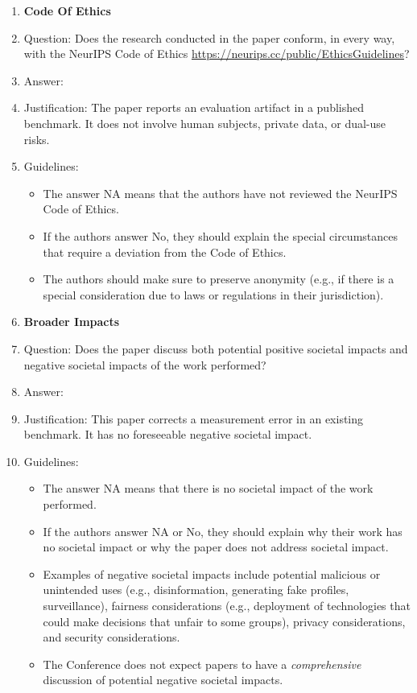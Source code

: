 \begin{enumerate}
\item {\bf Code Of Ethics}
\item[] Question: Does the research conducted in the paper conform, in every
way, with the NeurIPS Code of Ethics
\url{https://neurips.cc/public/EthicsGuidelines}?
\item[] Answer: \answerYes{}
\item[] Justification: The paper reports an evaluation artifact in a published
benchmark. It does not involve human subjects, private data, or dual-use
risks.
\item[] Guidelines:
\begin{itemize}
    \item The answer NA means that the authors have not reviewed the NeurIPS
    Code of Ethics.
    \item If the authors answer No, they should explain the special circumstances
    that require a deviation from the Code of Ethics.
    \item The authors should make sure to preserve anonymity (e.g., if there is
    a special consideration due to laws or regulations in their jurisdiction).
\end{itemize}

\item {\bf Broader Impacts}
\item[] Question: Does the paper discuss both potential positive societal impacts
and negative societal impacts of the work performed?
\item[] Answer: \answerNA{}
\item[] Justification: This paper corrects a measurement error in an existing
benchmark. It has no foreseeable negative societal impact.
\item[] Guidelines:
\begin{itemize}
    \item The answer NA means that there is no societal impact of the work
    performed.
    \item If the authors answer NA or No, they should explain why their work
    has no societal impact or why the paper does not address societal impact.
    \item Examples of negative societal impacts include potential malicious or
    unintended uses (e.g., disinformation, generating fake profiles, surveillance),
    fairness considerations (e.g., deployment of technologies that could make
    decisions that unfair to some groups), privacy considerations, and
    security considerations.
    \item The Conference does not expect papers to have a {\it comprehensive}
    discussion of potential negative societal impacts.
\end{itemize}


\end{enumerate}
